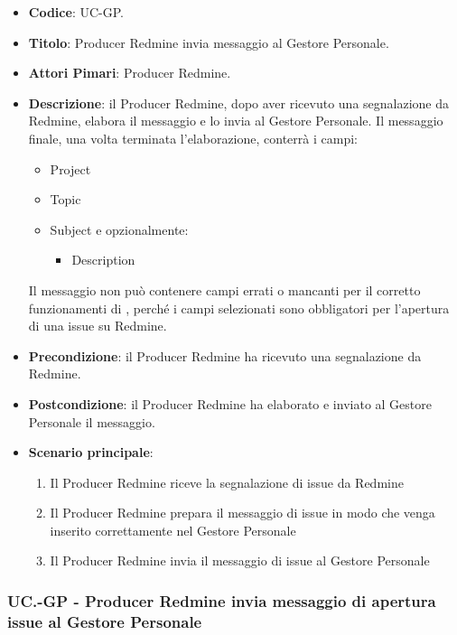 	\begin{itemize}
		\item \textbf{Codice}: UC\theuccount-GP.
		\item \textbf{Titolo}: Producer Redmine invia messaggio al Gestore Personale.
		\item \textbf{Attori Pimari}: Producer Redmine.
		\item \textbf{Descrizione}: il Producer Redmine, dopo aver ricevuto una
		 segnalazione da Redmine, elabora il messaggio e lo invia al Gestore Personale.
		 Il messaggio finale, una volta terminata l'elaborazione, conterrà i campi:
		 \begin{itemize}
		 	\item Project
		 	\item Topic
		 	\item Subject e opzionalmente:
		 	\begin{itemize}
		 		\item Description
		 	\end{itemize}
		 \end{itemize}
	 	Il messaggio non può contenere campi errati o mancanti per il corretto funzionamenti di \progetto, perché i campi selezionati sono obbligatori per l'apertura di una issue su Redmine.
		\item \textbf{Precondizione}: il Producer Redmine ha ricevuto una segnalazione da Redmine.
		\item \textbf{Postcondizione}: il Producer Redmine ha elaborato e inviato al Gestore Personale il messaggio.
		\item \textbf{Scenario principale}: 
		\begin{enumerate}
			\item Il Producer Redmine riceve la segnalazione di issue da Redmine
			\item Il Producer Redmine prepara il messaggio di issue in modo che venga inserito correttamente nel Gestore Personale
			\item Il Producer Redmine invia il messaggio di issue al Gestore Personale
		\end{enumerate}
		
	\end{itemize}
	
	\subsubsection{UC\theuccount.\thesubuccount-GP - Producer Redmine invia messaggio di apertura issue al Gestore Personale}
	

